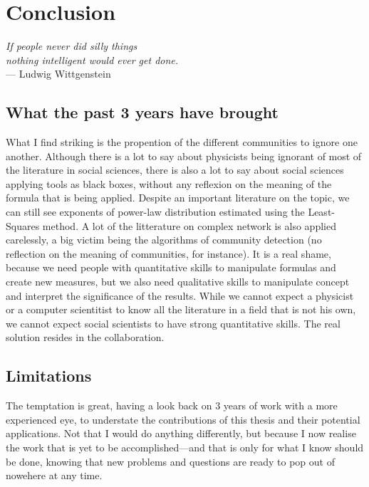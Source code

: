 %
\chapter{Conclusion}
\label{sec:conclusion}

\begin{flushright}{\slshape    
If people never did silly things\\
nothing intelligent would ever get done.} \\ \medskip
--- Ludwig Wittgenstein 
\end{flushright}


\section{What the past 3 years have brought}
\label{sec:what_the_past_3_years_have_brought}


What I find striking is the propention of the different communities to ignore
one another. Although there is a lot to say about physicists being ignorant of
most of the literature in social sciences, there is also a lot to say about
social sciences applying tools as black boxes, without any reflexion on the
meaning of the formula that is being applied. Despite an important literature on
the topic, we can still see exponents of power-law distribution estimated using
the Least-Squares method. A lot of the litterature on complex network is also
applied carelessly, a big victim being the algorithms of community detection (no
reflection on the meaning of communities, for instance). It is a real shame,
because we need people with quantitative skills to manipulate formulas and
create new measures, but we also need qualitative skills to manipulate concept
and interpret the significance of the results. While we cannot expect a
physicist or a computer scientitist to know all the literature in a field that
is not his own, we cannot expect social scientists to have strong quantitative
skills. The real solution resides in the collaboration.
\section{Limitations}
\label{sec:limitations}


The temptation is great, having a look back on $3$ years of work with a more
experienced eye, to understate the contributions of this thesis and their
potential applications. Not that I would do anything differently, but because I
now realise the work that is yet to be accomplished---and that is only for what
I know should be done, knowing that new problems and questions are ready to pop
out of nowehere at any time.

